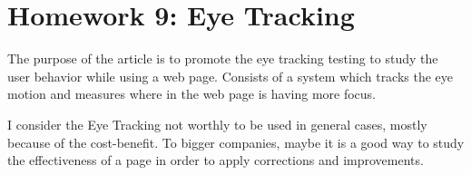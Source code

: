 \chapter{Homework 9: Eye Tracking}
	The purpose of the article is to promote the eye tracking testing to study the user behavior while using a web page. Consists of a system which tracks the eye motion and measures where in the web page is having more focus.

	I consider the Eye Tracking not worthly to be used in general cases, mostly because of the cost-benefit. To bigger companies, maybe it is a good way to study the effectiveness of a page in order to apply corrections and improvements.
